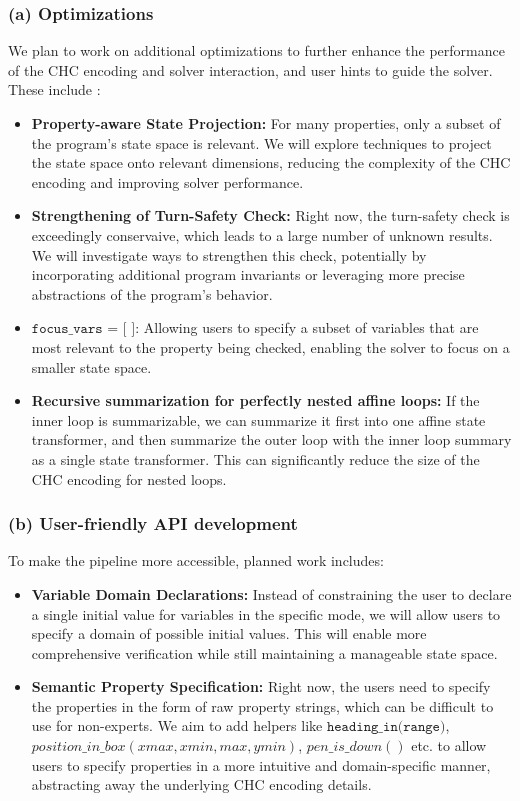 \subsubsection*{(a) Optimizations}
We plan to work on additional optimizations to further enhance the performance of the CHC encoding and solver interaction, and user hints to guide the solver. These include :
\begin{itemize}[leftmargin=1.5em]
  \item \textbf{Property-aware State Projection:} For many properties, only a subset of the program's state space is relevant. We will explore techniques to project the state space onto relevant dimensions, reducing the complexity of the CHC encoding and improving solver performance.
  \item \textbf{Strengthening of Turn-Safety Check:} Right now, the turn-safety check is exceedingly conservaive, which leads to a large number of unknown results. We will investigate ways to strengthen this check, potentially by incorporating additional program invariants or leveraging more precise abstractions of the program's behavior.
  \item $\texttt{focus\_vars = [ ]}$: Allowing users to specify a subset of variables that are most relevant to the property being checked, enabling the solver to focus on a smaller state space.
  \item \textbf{Recursive summarization for perfectly nested affine loops:} If the inner loop is summarizable, we can summarize it first into one affine state transformer, and then summarize the outer loop with the inner loop summary as a single state transformer. This can significantly reduce the size of the CHC encoding for nested loops.
\end{itemize}

\subsubsection*{(b) User-friendly API development}
To make the pipeline more accessible, planned work includes:
\begin{itemize}[leftmargin=1.5em]
  \item \textbf{Variable Domain Declarations:} Instead of constraining the user to declare a single initial value for variables in the specific mode, we will allow users to specify a domain of possible initial values. This will enable more comprehensive verification while still maintaining a manageable state space.
  \item \textbf{Semantic Property Specification:} Right now, the users need to specify the properties in the form of raw property strings, which can be difficult to use for non-experts. We aim to add helpers like $\texttt{heading\_in(range)}$, $position\_in\_box(xmax, xmin, max, ymin)$, $pen\_is\_down()$ etc. to allow users to specify properties in a more intuitive and domain-specific manner, abstracting away the underlying CHC encoding details. 
\end{itemize}

